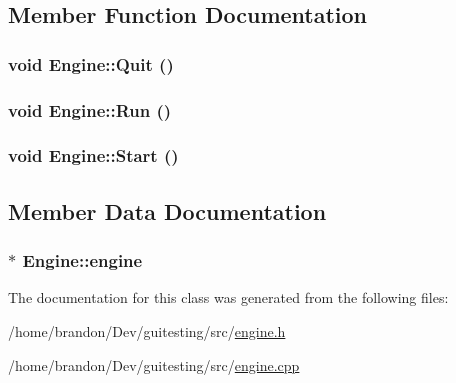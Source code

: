 \subsection{Member Function Documentation}
\hypertarget{class_engine_c703279e3531bc1e668115affceb8c37}{
\subsubsection[{Quit}]{\setlength{\rightskip}{0pt plus 5cm}void Engine::Quit ()}}
\label{class_engine_c703279e3531bc1e668115affceb8c37}


\hypertarget{class_engine_f4c789fb939a0870426c698a5124a0ee}{
\subsubsection[{Run}]{\setlength{\rightskip}{0pt plus 5cm}void Engine::Run ()}}
\label{class_engine_f4c789fb939a0870426c698a5124a0ee}


\hypertarget{class_engine_1fbe9f5cb4abc3572e432cae1f154817}{
\subsubsection[{Start}]{\setlength{\rightskip}{0pt plus 5cm}void Engine::Start ()}}
\label{class_engine_1fbe9f5cb4abc3572e432cae1f154817}




\subsection{Member Data Documentation}
\hypertarget{class_engine_84995269a911eabc5abd9dfa682fd05d}{
\subsubsection[{engine}]{ $\ast$ {\bf Engine::engine}}}
\label{class_engine_84995269a911eabc5abd9dfa682fd05d}




The documentation for this class was generated from the following files:\begin{CompactItemize}
\item 
/home/brandon/Dev/guitesting/src/\hyperlink{engine_8h}{engine.h}\item 
/home/brandon/Dev/guitesting/src/\hyperlink{engine_8cpp}{engine.cpp}\end{CompactItemize}
